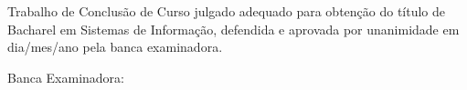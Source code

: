 \documentclass[
	12pt,				%
	openright,			%
	oneside,			%
	a4paper,			%
	sumario=tradicional, %
	english,			%
	french,				%
	spanish,			%
	brazil				%
	]{uastex}
\begin{document}

%
% 
%
\begin{folhadeaprovacao}

\begin{center}	
	{\fontsize{12pt}{\baselineskip}\selectfont\MakeUppercase{\imprimiruniversidade}} \\
	{\fontsize{12pt}{\baselineskip}\selectfont\MakeUppercase{\imprimirdepartamento}} \\
	{\fontsize{12pt}{\baselineskip}\selectfont\MakeUppercase{\imprimircurso}}\\
	\vfill
	\vspace*{5mm}
	{\fontsize{12pt}{\baselineskip}\selectfont\MakeUppercase{\imprimirautor}} \\
	\vfill
	\vspace*{5mm}
	{\fontsize{13pt}{\baselineskip}\selectfont\imprimirtitulo} \\
	\vfill
	{\fontsize{12pt}{\baselineskip}\selectfont Trabalho de Conclusão de Curso julgado adequado para obtenção do título de Bacharel em Sistemas de Informação, defendida e aprovada por unanimidade em dia/mes/ano pela banca examinadora.}
\end{center}

\vspace*{5mm}
\begin{flushleft}
	{\fontsize{12pt}{\baselineskip}\selectfont Banca Examinadora: }
\end{flushleft}
\vspace*{-10mm}
\vfill
\end{folhadeaprovacao}
\end{document}
